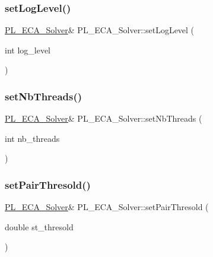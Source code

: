 \subsubsection{\texorpdfstring{set\+Log\+Level()}{setLogLevel()}}
{\footnotesize\ttfamily \hyperlink{class_p_l___e_c_a___solver}{P\+L\+\_\+\+E\+C\+A\+\_\+\+Solver}\& P\+L\+\_\+\+E\+C\+A\+\_\+\+Solver\+::set\+Log\+Level (\begin{DoxyParamCaption}\item[{int}]{log\+\_\+level }\end{DoxyParamCaption})\hspace{0.3cm}{\ttfamily [inline]}}

\mbox{\label{class_p_l___e_c_a___solver_a3e0926b81d114ad8754993fe9be92122}} 
\subsubsection{\texorpdfstring{set\+Nb\+Threads()}{setNbThreads()}}
{\footnotesize\ttfamily \hyperlink{class_p_l___e_c_a___solver}{P\+L\+\_\+\+E\+C\+A\+\_\+\+Solver}\& P\+L\+\_\+\+E\+C\+A\+\_\+\+Solver\+::set\+Nb\+Threads (\begin{DoxyParamCaption}\item[{int}]{nb\+\_\+threads }\end{DoxyParamCaption})\hspace{0.3cm}{\ttfamily [inline]}}

\mbox{\label{class_p_l___e_c_a___solver_aa08191661fd734646fa916959cac5728}} 
\subsubsection{\texorpdfstring{set\+Pair\+Thresold()}{setPairThresold()}}
{\footnotesize\ttfamily \hyperlink{class_p_l___e_c_a___solver}{P\+L\+\_\+\+E\+C\+A\+\_\+\+Solver}\& P\+L\+\_\+\+E\+C\+A\+\_\+\+Solver\+::set\+Pair\+Thresold (\begin{DoxyParamCaption}\item[{double}]{st\+\_\+thresold }\end{DoxyParamCaption})\hspace{0.3cm}{\ttfamily [inline]}}

